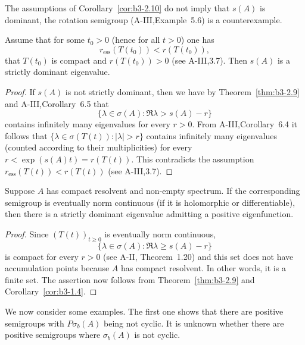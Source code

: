The assumptions of Corollary~\ref{cor:b3-2.10} do not imply that $s(A)$ is dominant, the rotation semigroup (A-III,Example~5.6) is a counterexample.
\begin{corollary}\label{cor:b3-2.11}
	Assume that for some $t_{0} > 0$ (hence for all $t > 0$) one has 
    \[
    r_{\text{ess}}(T(t_{0})) < r(T(t_{0})), 
    \]
    \eg that $T(t_{0})$ is compact and $r(T(t_{0})) > 0$ (see A-III,3.7).
	Then $s(A)$ is a strictly dominant eigenvalue.
\end{corollary}
\begin{proof}
	If $s(A)$ is not strictly dominant, then we have by Theorem~\ref{thm:b3-2.9} and A-III,Corollary~6.5 that 
    \[
    \{\lambda \in \sigma(A) \colon \Re\lambda > s(A) - r\}
    \]
    contains infinitely many eigenvalues for every $r > 0$.
	From A-III,Corollary~6.4 it follows that $\{\lambda \in \sigma(T(t)) \colon |\lambda| > r\}$ contains infinitely many eigenvalues (counted according to their multiplicities) for every $r < \exp(s(A)t) = r(T(t))$.
	This contradicts the assumption $r_{\text{ess}}(T(t)) < r(T(t))$ (see A-III,3.7).
\end{proof}
\begin{corollary}\label{cor:b3-2.12}
	Suppose $A$ has compact resolvent and non-empty spectrum.
	If the corresponding semigroup is eventually norm continuous (\eg if it is holomorphic or differentiable), then there is a strictly dominant eigenvalue admitting a positive eigenfunction.
\end{corollary}
\begin{proof}
	Since $(T(t))_{t \geq 0}$ is eventually norm continuous, 
    \[
    \{\lambda \in \sigma(A) \colon \Re\lambda \geq s(A)-r\}
    \]
    is compact for every $r > 0$ (see A-II, Theorem~1.20) and this set does not have accumulation points because $A$ has compact resolvent.
	In other words, it is a finite set.
	The assertion now follows from Theorem~\ref{thm:b3-2.9} and Corollary~\ref{cor:b3-1.4}.
\end{proof}
We now consider some examples. 
The first one shows that there are positive semigroups with $P\sigma_{b}(A)$ being not cyclic.
It is unknown whether there are positive semigroups where $\sigma_{b}(A)$ is not cyclic.
